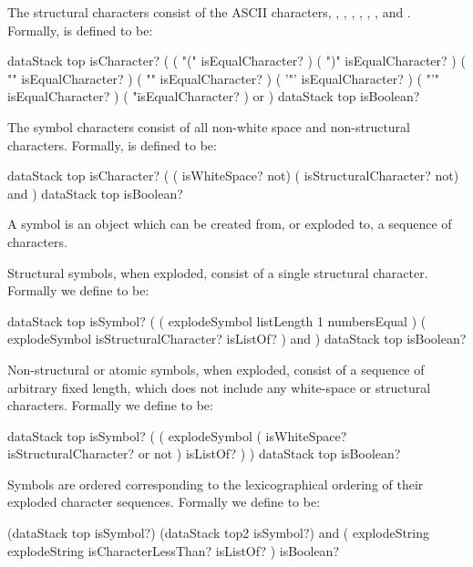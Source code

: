 The structural characters consist of the ASCII characters, \quote{(}, 
\quote{)}, \quote{\{}, \quote{\}}, , , and 
\quote{\textbackslash}. Formally,  is defined 
to be: 

\starttyping
{ dataStack top isCharacter? }
(
  ( "(" isEqualCharacter? )
  ( ")" isEqualCharacter? )
  ( "{" isEqualCharacter? )
  ( "}" isEqualCharacter? )
  ( '"' isEqualCharacter? )
  ( "'" isEqualCharacter? )
  ( "\" isEqualCharacter? )
  or
)
{ dataStack top isBoolean? }

\stoptyping

The symbol characters consist of all non-white space and non-structural 
characters. Formally,  is defined to be: 

\starttyping
{ dataStack top isCharacter? }
(
  ( isWhiteSpace? not)
  ( isStructuralCharacter? not)
  and
)
{ dataStack top isBoolean? }
\stoptyping

\stopDefinition

\subChapterAppendix[title=Symbols, reference=symbolSpec]


\startDefinition 

A symbol is an object which can be created from, or exploded to, a 
sequence of characters.


Structural symbols, when exploded, consist of a single structural 
character. Formally we define  to be:

\starttyping
{ dataStack top isSymbol? }
(
  ( explodeSymbol listLength 1 numbersEqual )
  ( explodeSymbol isStructuralCharacter? isListOf? )
  and
)
{ dataStack top isBoolean? }
\stoptyping

Non-structural or atomic symbols, when exploded, consist of a sequence of 
arbitrary fixed length, which does not include any white-space or 
structural characters. Formally we define   to be:

\starttyping
{ dataStack top isSymbol? }
(
  ( 
    explodeSymbol
    ( isWhiteSpace? isStructuralCharacter?  or not )
    isListOf?
  )
)
{ dataStack top isBoolean? }
\stoptyping


Symbols are ordered corresponding to the lexicographical ordering of their 
exploded character sequences. Formally we define  
to be: 

\starttyping
{
  (dataStack top isSymbol?)
  (dataStack top2 isSymbol?)
  and
}
( explodeString explodeString isCharacterLessThan? isListOf?
)
{ isBoolean? }
\stoptyping

